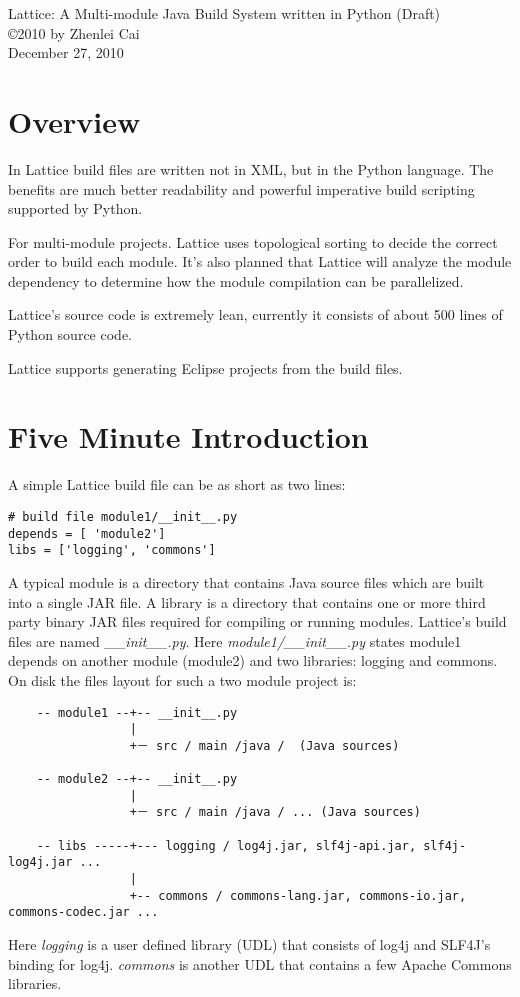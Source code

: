 \documentclass[12pt]{article}
\begin{document}
\begin{center}
{\large Lattice: A Multi-module Java Build System written in Python (Draft)} \\
\copyright 2010 by Zhenlei Cai \\
December 27, 2010
\end{center}

\section{Overview}
In Lattice build files are written not in XML, but in the Python
language. The benefits are much better readability and powerful
imperative build scripting supported by Python. 

For multi-module projects. Lattice uses topological sorting to decide
the correct order to build each module.  It's also planned that
Lattice will analyze the module
dependency to determine how the module compilation can be
parallelized.

Lattice's source code is extremely lean, currently it consists of
about 500 lines of Python source code.

Lattice supports generating Eclipse projects from the build files.


\section{Five Minute  Introduction}
A simple Lattice build file can be as short as two lines:

\begin{verbatim}
# build file module1/__init__.py
depends = [ 'module2']
libs = ['logging', 'commons']
\end{verbatim}

A typical module is a directory that contains Java source files which
are built into a single JAR file. A library is a directory that
contains one or more  third party binary JAR files required for
compiling or running modules. Lattice's build files are named {\it  \_\_init\_\_.py}. 
Here   {\it module1/\_\_init\_\_.py}  states module1 depends on another
module (module2) 
and two libraries: logging and commons.  On disk the files layout for such a two module project is:

\begin{verbatim}
    -- module1 --+-- __init__.py
                 |
                 +－ src / main /java /  (Java sources)

    -- module2 --+-- __init__.py
                 |
                 +－ src / main /java / ... (Java sources)

    -- libs -----+--- logging / log4j.jar, slf4j-api.jar, slf4j-log4j.jar ...
                 |
                 +-- commons / commons-lang.jar, commons-io.jar, commons-codec.jar ...
\end{verbatim}
Here {\it logging} is a user defined library (UDL) that consists of log4j and SLF4J's binding for log4j. {\it commons} is another  UDL that contains a few Apache Commons libraries. 
\end{document}

